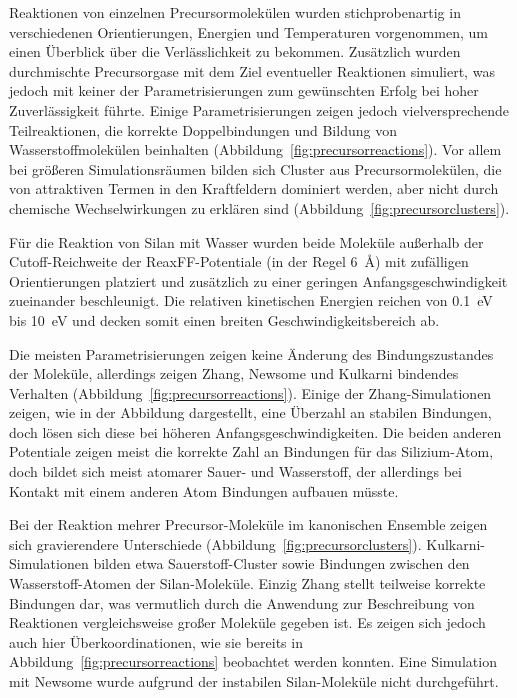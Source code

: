 Reaktionen von einzelnen Precursormolekülen wurden stichprobenartig in verschiedenen Orientierungen, Energien und Temperaturen vorgenommen, um einen Überblick über die Verlässlichkeit zu bekommen.
Zusätzlich wurden durchmischte Precursorgase mit dem Ziel eventueller Reaktionen simuliert, was jedoch mit keiner der Parametrisierungen zum gewünschten Erfolg bei hoher Zuverlässigkeit führte.
Einige Parametrisierungen zeigen jedoch vielversprechende Teilreaktionen, die korrekte Doppelbindungen und Bildung von Wasserstoffmolekülen beinhalten (Abbildung~\ref{fig:precursorreactions}).
Vor allem bei größeren Simulationsräumen bilden sich Cluster aus Precursormolekülen, die von attraktiven Termen in den Kraftfeldern dominiert werden, aber nicht durch chemische Wechselwirkungen zu erklären sind (Abbildung~\ref{fig:precursorclusters}).

Für die Reaktion von Silan mit Wasser wurden beide Moleküle außerhalb der Cutoff-Reich\-weite der ReaxFF-Potentiale (in der Regel \SI{6}{\angstrom}) mit zufälligen Orientierungen platziert und zusätzlich zu einer geringen Anfangsgeschwindigkeit zueinander beschleunigt.
Die relativen kinetischen Energien reichen von \SI{0.1}{\electronvolt} bis \SI{10}{\electronvolt} und decken somit einen breiten Geschwindigkeitsbereich ab.

Die meisten Parametrisierungen zeigen keine Änderung des Bindungszustandes der Moleküle, allerdings zeigen Zhang, Newsome und Kulkarni bindendes Verhalten (Abbildung~\ref{fig:precursorreactions}).
Einige der Zhang-Simulationen zeigen, wie in der Abbildung dargestellt, eine Überzahl an stabilen Bindungen, doch lösen sich diese bei höheren Anfangsgeschwindigkeiten.
Die beiden anderen Potentiale zeigen meist die korrekte Zahl an Bindungen für das Silizium-Atom, doch bildet sich meist atomarer Sauer- und Wasserstoff, der allerdings bei Kontakt mit einem anderen Atom Bindungen aufbauen müsste.

Bei der Reaktion mehrer Precursor-Moleküle im kanonischen Ensemble zeigen sich gravierendere Unterschiede (Abbildung~\ref{fig:precursorclusters}).
Kulkarni-Simulationen bilden etwa Sauerstoff-Cluster sowie Bindungen zwischen den Wasserstoff-Atomen der Silan-Moleküle.
Einzig Zhang stellt teilweise korrekte Bindungen dar, was vermutlich durch die Anwendung zur Beschreibung von Reaktionen vergleichsweise großer Moleküle gegeben ist.
Es zeigen sich jedoch auch hier Überkoordinationen, wie sie bereits in Abbildung~\ref{fig:precursorreactions} beobachtet werden konnten.
Eine Simulation mit Newsome wurde aufgrund der instabilen Silan-Moleküle nicht durchgeführt.

